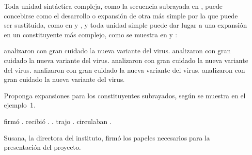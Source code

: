 Toda unidad sintáctica compleja, como la secuencia subrayada en
, puede concebirse como el desarrollo o expansión de otra
más simple por la que puede ser sustituida, como en  y
, y toda unidad simple puede dar lugar a una expansión en
un constituyente más complejo, como se muestra en  y
:

\begin{exe}
  \ex\label{ex:05-conicet}
    \begin{xlist}
      \ex\label{ex:05-conicet-a} 
          analizaron con gran cuidado la nueva variante del virus.
      \ex\label{ex:05-conicet-b}  analizaron con
          gran cuidado la nueva variante del virus.
      \ex\label{ex:05-conicet-c}  analizaron con gran cuidado la
          nueva variante del virus.
      \ex\label{ex:05-conicet-d}  analizaron con gran cuidado la nueva variante del virus.
      \ex\label{ex:05-conicet-e} 
          analizaron con gran cuidado la nueva variante del virus.
    \end{xlist}
\end{exe}

\begin{ejercicio}\label{ej:05-expansion}
Proponga expansiones para los constituyentes subrayados, según se muestra en el
ejemplo~1.

\begin{exe}
  \ex {} firmó .
  \ex {} recibió .
  \ex {} .
  \ex {} trajo .
  \ex {} circulaban .
\end{exe}

\begin{resuelto}
Susana, la directora del instituto, firmó los papeles necesarios para la
presentación del proyecto.
\end{resuelto}
\end{ejercicio}

